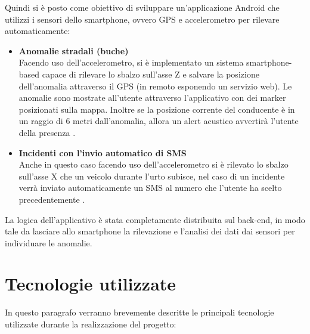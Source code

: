 \documentclass[a4paper, 11pt]{article} %
\begin{document}
Quindi si è posto come obiettivo di sviluppare un'applicazione Android che utilizzi i sensori dello smartphone, ovvero GPS e accelerometro per rilevare automaticamente:
\begin{itemize}
	
	\item \textbf{Anomalie stradali (buche)} \\
	Facendo uso dell'accelerometro, si è implementato un sistema smartphone-based capace di rilevare lo sbalzo sull'asse Z e salvare la posizione dell’anomalia attraverso il GPS (in remoto esponendo un servizio web). Le anomalie sono mostrate all’utente attraverso l’applicativo con dei marker posizionati sulla mappa. Inoltre se la posizione corrente del conducente è in un raggio di 6 metri dall’anomalia, allora un alert acustico avvertirà l'utente della presenza \cite{Mohamed2016}.
	
	\item \textbf{Incidenti con l'invio automatico di SMS} \\
	Anche in questo caso facendo uso dell'accelerometro si è rilevato lo sbalzo sull’asse X che un veicolo durante l’urto subisce, nel caso di un incidente verrà inviato automaticamente un SMS al numero che l'utente ha scelto precedentemente \cite{Faiz2016}.
	
\end{itemize} 
La logica dell'applicativo è stata completamente distribuita sul back-end, in modo tale da lasciare allo smartphone la rilevazione e l'analisi dei dati dai sensori per individuare le anomalie. 
 
\section{Tecnologie utilizzate}
In questo paragrafo verranno brevemente descritte le principali tecnologie utilizzate durante la realizzazione del progetto:
\end{document}
